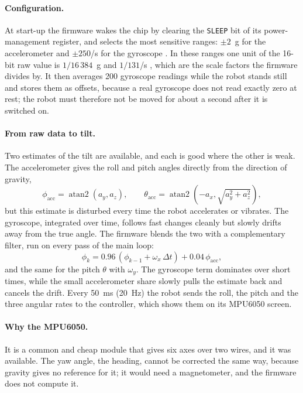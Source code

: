 \paragraph{Configuration.} At start-up the firmware wakes the chip by clearing the
\texttt{SLEEP} bit of its power-management register, and selects the most sensitive
ranges: \(\pm 2\)~g for the accelerometer and \(\pm 250\)\textdegree/s for the gyroscope
\cite{mpu6000_rm}. In these ranges one unit of the 16-bit raw value is
\(1/16\,384\)~g and \(1/131\)\textdegree/s \cite{mpu6000_ps}, which are the scale factors
the firmware divides by. It then averages 200 gyroscope readings while the robot stands
still and stores them as offsets, because a real gyroscope does not read exactly zero at
rest; the robot must therefore not be moved for about a second after it is switched on.

\paragraph{From raw data to tilt.} Two estimates of the tilt are available, and each is
good where the other is weak. The accelerometer gives the roll and pitch angles directly
from the direction of gravity,
\begin{equation}
  \phi_{\text{acc}} = \operatorname{atan2}(a_y, a_z), \qquad
  \theta_{\text{acc}} = \operatorname{atan2}\!\left(-a_x, \sqrt{a_y^2 + a_z^2}\right),
\end{equation}
but this estimate is disturbed every time the robot accelerates or vibrates. The
gyroscope, integrated over time, follows fast changes cleanly but slowly drifts away
from the true angle. The firmware blends the two with a complementary filter, run on
every pass of the main loop:
\begin{equation}
  \phi_k = 0.96 \,(\phi_{k-1} + \omega_x \, \Delta t) + 0.04 \, \phi_{\text{acc}},
\end{equation}
and the same for the pitch \(\theta\) with \(\omega_y\). The gyroscope term dominates over
short times, while the small accelerometer share slowly pulls the estimate back and
cancels the drift. Every 50~ms (20~Hz) the robot sends the roll, the pitch and the three
angular rates to the controller, which shows them on its MPU6050 screen.

\paragraph{Why the MPU6050.} It is a common and cheap module that gives six axes over two
wires, and it was available. The yaw angle, the heading, cannot be corrected the
same way, because gravity gives no reference for it; it would need a magnetometer, and
the firmware does not compute it.

